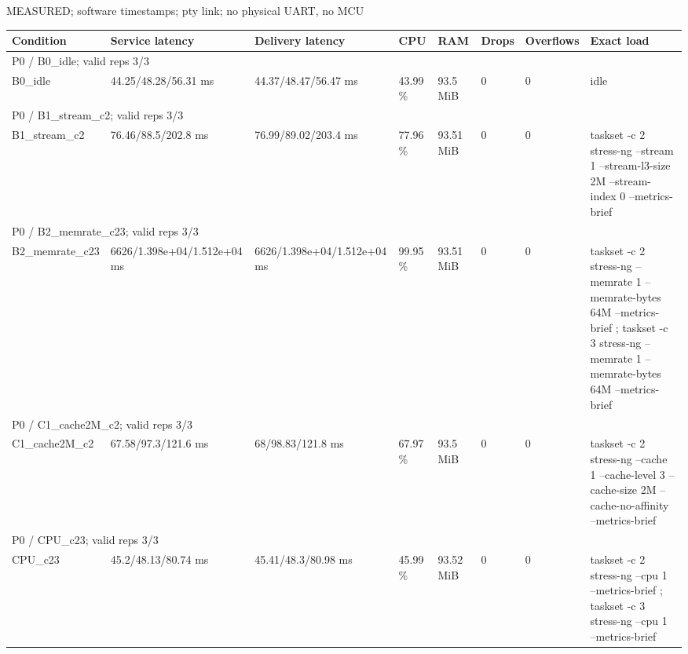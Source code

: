 \par\noindent MEASURED; software timestamps; pty link; no physical UART, no MCU\par
\begin{tabular}{llllllll}
\toprule
Condition & Service latency & Delivery latency & CPU & RAM & Drops & Overflows & Exact load \\
\midrule
\multicolumn{8}{l}{P0 / B0\_idle; valid reps 3/3} \\
B0\_idle & 44.25/48.28/56.31 ms & 44.37/48.47/56.47 ms & 43.99 \% & 93.5 MiB & 0 & 0 & idle \\
\multicolumn{8}{l}{P0 / B1\_stream\_c2; valid reps 3/3} \\
B1\_stream\_c2 & 76.46/88.5/202.8 ms & 76.99/89.02/203.4 ms & 77.96 \% & 93.51 MiB & 0 & 0 & taskset -c 2 stress-ng --stream 1 --stream-l3-size 2M --stream-index 0 --metrics-brief \\
\multicolumn{8}{l}{P0 / B2\_memrate\_c23; valid reps 3/3} \\
B2\_memrate\_c23 & 6626/1.398e+04/1.512e+04 ms & 6626/1.398e+04/1.512e+04 ms & 99.95 \% & 93.51 MiB & 0 & 0 & taskset -c 2 stress-ng --memrate 1 --memrate-bytes 64M --metrics-brief ; taskset -c 3 stress-ng --memrate 1 --memrate-bytes 64M --metrics-brief \\
\multicolumn{8}{l}{P0 / C1\_cache2M\_c2; valid reps 3/3} \\
C1\_cache2M\_c2 & 67.58/97.3/121.6 ms & 68/98.83/121.8 ms & 67.97 \% & 93.5 MiB & 0 & 0 & taskset -c 2 stress-ng --cache 1 --cache-level 3 --cache-size 2M --cache-no-affinity --metrics-brief \\
\multicolumn{8}{l}{P0 / CPU\_c23; valid reps 3/3} \\
CPU\_c23 & 45.2/48.13/80.74 ms & 45.41/48.3/80.98 ms & 45.99 \% & 93.52 MiB & 0 & 0 & taskset -c 2 stress-ng --cpu 1 --metrics-brief ; taskset -c 3 stress-ng --cpu 1 --metrics-brief \\
\bottomrule
\end{tabular}
